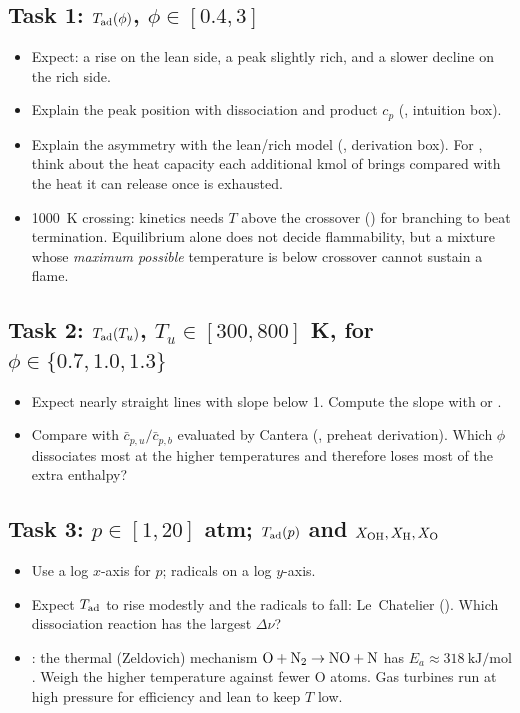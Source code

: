 \subsection*{Task 1: $T_{\mathrm{ad}}(\phi)$, $\phi\in[0.4,3]$}
\begin{itemize}
  \item Expect: a rise on the lean side, a peak slightly rich, and a slower decline on the rich side.
  \item Explain the peak position with dissociation and product $c_p$ (, intuition box).
  \item Explain the asymmetry with the lean/rich model (, derivation box). For ,
        think about the heat capacity each additional kmol of  brings compared with the heat it can
        release once  is exhausted.
  \item \SI{1000}{\kelvin} crossing: kinetics needs $T$ above the crossover () for branching
        to beat termination. Equilibrium alone does not decide flammability, but a mixture whose
        \emph{maximum possible} temperature is below crossover cannot sustain a flame.
\end{itemize}

\subsection*{Task 2: $T_{\mathrm{ad}}(T_u)$, $T_u\in[300,800]$ K, for $\phi\in\{0.7,1.0,1.3\}$}
\begin{itemize}
  \item Expect nearly straight lines with slope below 1. Compute the slope with  or
        .
  \item Compare with $\bar c_{p,u}/\bar c_{p,b}$ evaluated by Cantera (, preheat
        derivation). Which $\phi$ dissociates most at the higher temperatures and therefore loses
        most of the extra enthalpy?
\end{itemize}

\subsection*{Task 3: $p\in[1,20]$ atm; $T_{\mathrm{ad}}(p)$ and $X_{\mathrm{OH}},X_{\mathrm{H}},X_{\mathrm{O}}$}
\begin{itemize}
  \item Use a log $x$-axis for $p$; radicals on a log $y$-axis.
  \item Expect $T_{\mathrm{ad}}$ to rise modestly and the radicals to fall: Le~Chatelier ().
        Which dissociation reaction has the largest $\Delta\nu$?
  \item {}: the thermal (Zeldovich) mechanism $\mathrm{O}+\mathrm{N_2}\to\mathrm{NO}+\mathrm{N}$ has $E_a\approx\SI{318}{\kilo\joule\per\mole}$.
        Weigh the higher temperature against fewer O atoms. Gas turbines run at high pressure for efficiency
        and lean to keep $T$ low.
\end{itemize}

